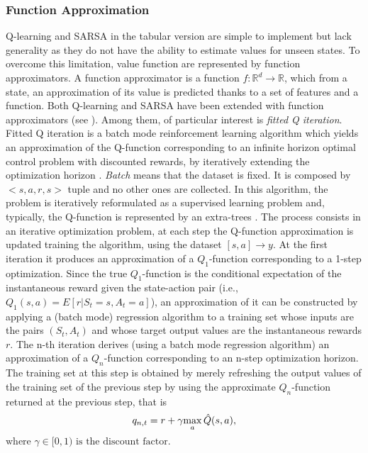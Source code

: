 \subsubsection{Function Approximation} 
Q-learning and SARSA in the tabular version are simple to implement but lack generality as they do not have the ability to estimate values for unseen states.
To overcome this limitation, value function are represented by function approximators. A function approximator is a function $f:\mathbb{R}^{d} \rightarrow \mathbb{R}$, which from a state, an approximation of its value is predicted thanks to a set of features and a function.
Both Q-learning and SARSA have been extended with function approximators (see \cite{atari} \cite{semisarsa}). Among them, of particular interest is \textit{fitted Q iteration}.
Fitted Q iteration is a batch mode reinforcement learning algorithm which yields an approximation of the Q-function corresponding to an infinite horizon optimal control problem with discounted rewards, by iteratively extending the optimization horizon \cite{fqi}. \textit{Batch} means that the dataset is fixed. It is composed by $<s,a,r,s>$ tuple and no other ones are collected. In this algorithm, the problem is iteratively reformulated as a supervised learning problem and, typically, the Q-function is represented by an extra-trees \cite{extratrees}.
The process consists in an iterative optimization problem, at each step the Q-function approximation is updated training the algorithm, using the dataset $[s,a] \rightarrow y$. 
At the first iteration it produces an approximation of a $Q_1$-function corresponding to a 1-step optimization. Since the true $Q_1$-function is the conditional expectation of the instantaneous reward given the state-action pair (i.e., $Q_1(s, a) = E[r |S_t = s, A_t = a]$), an approximation of it can be constructed by applying a (batch mode) regression algorithm to a training set whose inputs are the pairs $(S_t, A_t )$ and whose target output values are the instantaneous rewards $r$.
The n-th iteration derives (using a batch mode regression algorithm) an approximation of a $Q_n$-function corresponding to an n-step optimization horizon. The training set at this step is obtained by merely refreshing the output values of the training set of the previous step by using the approximate $Q_n$-function returned at the previous step, that is \begin{equation}q_{n,t}=r + \gamma \smash{\displaystyle \max_a \hat{Q}(s,a)},\end{equation} $\text{where } \gamma \in [0,1)\text{ is the discount factor}.$



